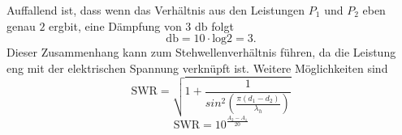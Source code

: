 Auffallend ist, dass wenn das Verhältnis aus den Leistungen $P_1$ und $P_2$ eben genau $2$ ergbit, eine Dämpfung von 3 $\si{\decibel}$ folgt
\begin{equation*}
    \si{\decibel} = 10 \cdot \text{log} 2 = 3.
\end{equation*}
Dieser Zusammenhang kann zum Stehwellenverhältnis führen, da die Leistung eng mit der elektrischen Spannung verknüpft ist. Weitere Möglichkeiten sind 
\begin{equation}
    \text{SWR} =\sqrt{1 + \frac{1}{ sin^2 \left( \frac{\pi (d_1 - d_2)}{\lambda_h}  \right)} } 
\end{equation}
\begin{equation}
    \text{SWR} = 10^{\frac{A_2-A_1}{20}}
\end{equation}
